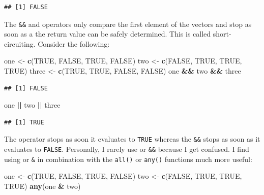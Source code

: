 \documentclass[]{gitbook}
\newenvironment{Shaded}{\begin{snugshade}}{\end{snugshade}}
\newcommand{\KeywordTok}[1]{\textcolor[rgb]{0.13,0.29,0.53}{\textbf{#1}}}
\newcommand{\NormalTok}[1]{#1}
\newcommand{\OperatorTok}[1]{\textcolor[rgb]{0.81,0.36,0.00}{\textbf{#1}}}
\newcommand{\OtherTok}[1]{\textcolor[rgb]{0.56,0.35,0.01}{#1}}
\newcommand{\StringTok}[1]{\textcolor[rgb]{0.31,0.60,0.02}{#1}}
\begin{document}
\begin{verbatim}
## [1] FALSE
\end{verbatim}

The \texttt{\&\&} and \texttt{\textbar{}\textbar{}} operators only compare the first element of the vectors and stop as soon as a the return
value can be safely determined. This is called short-circuiting. Consider the following:

\begin{Shaded}
\begin{Highlighting}[]
\NormalTok{one <-}\StringTok{ }\KeywordTok{c}\NormalTok{(}\OtherTok{TRUE}\NormalTok{, }\OtherTok{FALSE}\NormalTok{, }\OtherTok{TRUE}\NormalTok{, }\OtherTok{FALSE}\NormalTok{)}
\NormalTok{two <-}\StringTok{ }\KeywordTok{c}\NormalTok{(}\OtherTok{FALSE}\NormalTok{, }\OtherTok{TRUE}\NormalTok{, }\OtherTok{TRUE}\NormalTok{, }\OtherTok{TRUE}\NormalTok{)}
\NormalTok{three <-}\StringTok{ }\KeywordTok{c}\NormalTok{(}\OtherTok{TRUE}\NormalTok{, }\OtherTok{TRUE}\NormalTok{, }\OtherTok{FALSE}\NormalTok{, }\OtherTok{FALSE}\NormalTok{)}
\NormalTok{one }\OperatorTok{&&}\StringTok{ }\NormalTok{two }\OperatorTok{&&}\StringTok{ }\NormalTok{three}
\end{Highlighting}
\end{Shaded}

\begin{verbatim}
## [1] FALSE
\end{verbatim}

\begin{Shaded}
\begin{Highlighting}[]
\NormalTok{one }\OperatorTok{||}\StringTok{ }\NormalTok{two }\OperatorTok{||}\StringTok{ }\NormalTok{three}
\end{Highlighting}
\end{Shaded}

\begin{verbatim}
## [1] TRUE
\end{verbatim}

The \texttt{\textbar{}\textbar{}} operator stops as soon it evaluates to \texttt{TRUE} whereas the \texttt{\&\&} stops as soon as it evaluates to \texttt{FALSE}.
Personally, I rarely use \texttt{\textbar{}\textbar{}} or \texttt{\&\&} because I get confused. I find using \texttt{\textbar{}} or \texttt{\&} in combination with the
\texttt{all()} or \texttt{any()} functions much more useful:

\begin{Shaded}
\begin{Highlighting}[]
\NormalTok{one <-}\StringTok{ }\KeywordTok{c}\NormalTok{(}\OtherTok{TRUE}\NormalTok{, }\OtherTok{FALSE}\NormalTok{, }\OtherTok{TRUE}\NormalTok{, }\OtherTok{FALSE}\NormalTok{)}
\NormalTok{two <-}\StringTok{ }\KeywordTok{c}\NormalTok{(}\OtherTok{FALSE}\NormalTok{, }\OtherTok{TRUE}\NormalTok{, }\OtherTok{TRUE}\NormalTok{, }\OtherTok{TRUE}\NormalTok{)}
\KeywordTok{any}\NormalTok{(one }\OperatorTok{&}\StringTok{ }\NormalTok{two)}
\end{Highlighting}
\end{Shaded}
\end{document}
